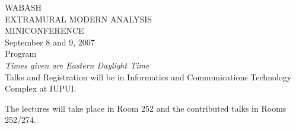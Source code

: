 \vspace{2ex}
\begin{center}
{\TitleFont WABASH}\\
\smallskip
{\SubTitleFont EXTRAMURAL MODERN ANALYSIS}\\
\smallskip
{\TitleFont MINICONFERENCE}\\
\vspace{.2in}
 {\DateFont   September 8 and 9, 2007}\\
\vspace{.2in}
{\TitleFont Program}\\[.2in]

{\em Times given are Eastern Daylight Time}\\[.3in]


Talks and Registration will be in Informatics and Communications Technology Complex at IUPUI.

 The
lectures will take place in Room 252 and the contributed talks in Rooms 252/274.
\end{center} \smallskip

